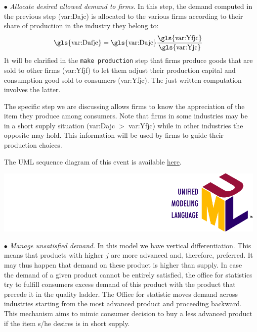 \documentclass{book}
\newcommand{\doclocation}{file:///Users/giulioni/Documents/workspace/gabriele/docs}
\begin{document}
\noindent$\bullet$ \textit{Allocate desired allowed demand to firms.} In this step, the demand computed in the previous step (\gls{var:Dajc}) is allocated to the various firms according to their share of production in the industry they belong to:
\begin{equation}
	\textnormal{\gls{var:Dafjc}}=\textnormal{\gls{var:Dajc}}\frac{\textnormal{\gls{var:Yfjc}}}{\textnormal{\gls{var:Yjc}}}
	\label{eq:Dafjc}
\end{equation}
It will be clarified in the \verb+make production+ step that firms produce goods that are sold to other firms (\gls{var:Yfjf}) to let them adjust their production capital and consumption good sold to consumers (\gls{var:Yfjc}). The just written computation involves the latter.
 
The specific step we are discussing allows firms to know the appreciation of the item they produce among consumers. 
Note that firms in some industries may be in a short supply situation (\gls{var:Dajc} $>$ \gls{var:Yfjc}) while in other industries the opposite may hold. This information will be used by firms to guide their production choices.

The UML sequence diagram of this event is available \href{\doclocation/umldoc/allocateDesiredDemand.html}{here}.
\begin{marginfigure}
	\includegraphics[scale=0.1]{uml.png}
\end{marginfigure}

\noindent$\bullet$ \textit{Manage unsatisfied demand.} In this model we have vertical differentiation. This means that products with higher $j$ are more advanced and, therefore, preferred. It may thus happen that demand on these product is higher than supply. 
In case the demand of a given product cannot be entirely satisfied, the office for statistics try to fulfill consumers excess demand of this product with the product that precede it in the quality ladder. The Office for statistic moves demand across industries starting from the most advanced product and proceeding backward. 
This mechanism aims to mimic consumer decision to buy a less advanced product if the item s/he desires is in short supply.
\end{document}
